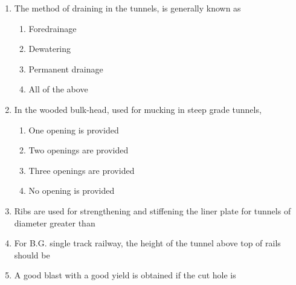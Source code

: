 \documentclass[11pt,a4paper]{article}
\begin{document}
\begin{enumerate}
\\
\item{The method of draining in the tunnels, is generally known as}
\begin{enumerate}[label=\Alph*.]
\item{Foredrainage}
\item{Dewatering}
\item{Permanent drainage}
\item{All of the above}
\end{enumerate}
\item{In the wooded bulk-head, used for mucking in steep grade tunnels,}
\begin{enumerate}[label=\Alph*.]
\item{One opening is provided}
\item{Two openings are provided}
\item{Three openings are provided}
\item{No opening is provided}
\end{enumerate}
\item{Ribs are used for strengthening and stiffening the liner plate for tunnels of diameter greater than}
\\
\item{For B.G. single track railway, the height of the tunnel above top of rails should be}
\\
\item{A good blast with a good yield is obtained if the cut hole is}

\end{enumerate}
\end{document}

